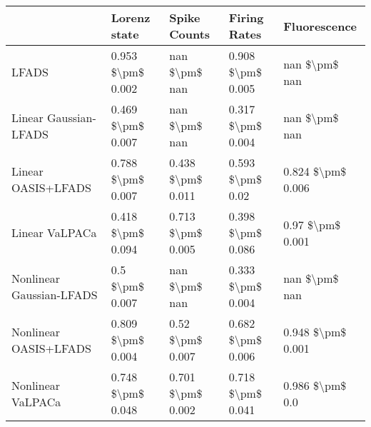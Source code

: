 \begin{tabular}{lllll}
\toprule
{} &       Lorenz state &       Spike Counts &       Firing Rates &       Fluorescence \\
\midrule
LFADS                    &  0.953 \$\textbackslash pm\$ 0.002 &      nan \$\textbackslash pm\$ nan &  0.908 \$\textbackslash pm\$ 0.005 &      nan \$\textbackslash pm\$ nan \\
Linear Gaussian-LFADS    &  0.469 \$\textbackslash pm\$ 0.007 &      nan \$\textbackslash pm\$ nan &  0.317 \$\textbackslash pm\$ 0.004 &      nan \$\textbackslash pm\$ nan \\
Linear OASIS+LFADS       &  0.788 \$\textbackslash pm\$ 0.007 &  0.438 \$\textbackslash pm\$ 0.011 &   0.593 \$\textbackslash pm\$ 0.02 &  0.824 \$\textbackslash pm\$ 0.006 \\
Linear VaLPACa           &  0.418 \$\textbackslash pm\$ 0.094 &  0.713 \$\textbackslash pm\$ 0.005 &  0.398 \$\textbackslash pm\$ 0.086 &   0.97 \$\textbackslash pm\$ 0.001 \\
Nonlinear Gaussian-LFADS &    0.5 \$\textbackslash pm\$ 0.007 &      nan \$\textbackslash pm\$ nan &  0.333 \$\textbackslash pm\$ 0.004 &      nan \$\textbackslash pm\$ nan \\
Nonlinear OASIS+LFADS    &  0.809 \$\textbackslash pm\$ 0.004 &   0.52 \$\textbackslash pm\$ 0.007 &  0.682 \$\textbackslash pm\$ 0.006 &  0.948 \$\textbackslash pm\$ 0.001 \\
Nonlinear VaLPACa        &  0.748 \$\textbackslash pm\$ 0.048 &  0.701 \$\textbackslash pm\$ 0.002 &  0.718 \$\textbackslash pm\$ 0.041 &    0.986 \$\textbackslash pm\$ 0.0 \\
\bottomrule
\end{tabular}
